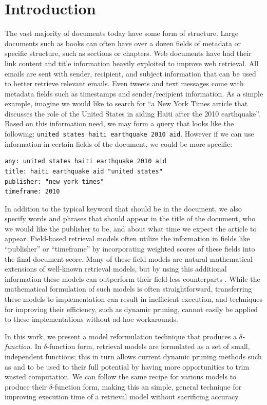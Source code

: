 \documentclass{sig-alternate}
\newcommand{\method}[1]{{\sc{#1}}}
\begin{document}
\section{Introduction}
The vast majority of documents today have some form of structure. Large documents such as books can often have over a dozen fields of metadata or specific structure, such as sections or chapters. Web documents have had their link content and title information heavily exploited to improve web retrieval. All emails are sent with sender, recipient, and subject information that can be used to better retrieve relevant emails. Even tweets and text messages come with metadata fields such as timestamps and sender/recipient information. As a simple example, imagine we would like to search for ``a New York Times article that discusses the role of the United States in aiding Haiti after the 2010 earthquake''. Based on this information need, we may form a query that looks like the following: \verb|united states haiti earthquake 2010 aid|. However if we can use information in certain fields of the document, we could be more specific:
\begin{verbatim}
any: united states haiti earthquake 2010 aid
title: haiti earthquake aid "united states"
publisher: "new york times"
timeframe: 2010
\end{verbatim}
In addition to the typical keyword that should be in the document, we also specify words and phrases that should appear in the title of the document, who we would like the publisher to be, and about what time we expect the article to appear. Field-based retrieval models often utilize the information in fields like ``publisher'' or ``timeframe'' by incorporating weighted scores of these fields into the final document score. Many of these field models are natural mathematical extensions of well-known retrieval models, but by using this additional information these models can outperform their field-less counterparts \cite{craswell-trec-web-2004,macdonald-trec-2005,kim-sigir-2009}. While the mathematical formulation of such models is often straightforward, transferring these models to implementation can result in inefficient execution, and techniques for improving their efficiency, such as dynamic pruning, cannot easily be applied to these implementations without ad-hoc workarounds.

In this work, we present a model reformulation technique that produces a \textit{$\delta$-function}. In $\delta$-function form, retrieval models are formulated as a set of small, independent functions; this in turn allows current dynamic pruning methods such as \method{maxscore} and \method{wand} to be used to their full potential by having more opportunities to trim wasted computation. We can follow the same recipe for various models to produce their $\delta$-function form, making this an simple, general technique for improving execution time of a retrieval model without sacrificing accuracy.
\end{document}
